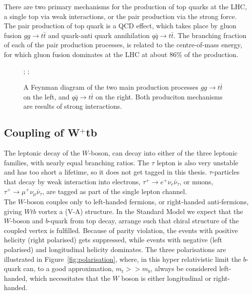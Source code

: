 \documentclass[12pt,a4paper]{article}
\numberwithin{equation}{section}
\begin{document}
There are two primary mechanisms for the production of top quarks at the LHC, a
single top via weak interactions, or the pair production via the strong force.
The pair production of top quark is a QCD effect, which takes place by gluon
fusion $gg \rightarrow t\bar t$ and quark-anti quark annihilation $q\bar q \rightarrow t\bar t$. The
branching fraction of each of the pair production processes, is related to the
centre-of-mass energy, for which gluon fusion dominates at the LHC at about 86\%
of the production\cite{dasilva2016quark}.
\begin{figure}[H]
  \centering
  \hfill{}
  ;\hfill{}
  ;
  \hfill{}
	\caption{A Feynman diagram of the two main production processes $gg \rightarrow t\bar t$
    on the left, and $q\bar q \rightarrow t\bar t$ on the right. Both produciton
    mechanisms are results of strong interactions.}\label{fig:ttproduction}
\end{figure}

\subsection{Coupling of W$^+$tb}\label{sec:coupling}
The leptonic decay of the $W$-boson, can decay into either of the three leptonic
families, with nearly equal branching ratios. The $\tau$ lepton is also very
unstable and has too short a lifetime, so it does not get tagged in this thesis.
$\tau$-particles that decay by weak interaction into electrons,
$\tau^+ \rightarrow e^+ \nu_e \bar \nu_{\tau}$, or muons, $\tau^+ \rightarrow \mu^+ \nu_\mu \bar \nu_{\tau}$, are tagged as part of
the single lepton channel.\\

The $W$-boson couples only to left-handed fermions, or right-handed
anti-fermions, giving $Wtb$ vortex a (V-A) structure. In the Standard Model we
expect that the $W$-boson and $b$-quark from top decay, arrange such that chiral
structure of the coupled vertex is fulfilled. Because of parity violation, the
events with positive helicity (right polarised) gets suppressed, while events
with negative (left polarised) and longitudinal helicity dominates. The three
polarisations are illustrated in Figure~\ref{fig:polarisation}, where, in this
hyper relativistic limit the $b$-quark can, to a good approximation,
$m_t >> m_b$, always be considered left-handed, which necessitates that the $W$
boson is either longitudinal or right-handed.
\end{document}
